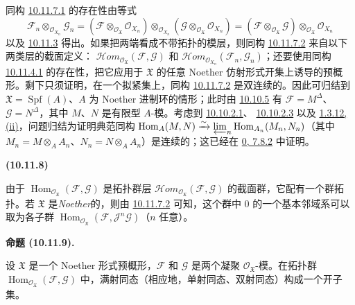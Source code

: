 \documentclass[UTF8,fontset=none,11pt,oneside,openany]{ctexbook}
\newenvironment{env}[1][]{%
  \par\medskip\noindent\textbf{(#1)}\ %
}{\par}
\newenvironment{proposition}[1][]{%
  \par\medskip\noindent\textbf{命题 (#1).}\ %
}{\par}
\let\EGAOriginalLabel\label
\renewcommand{\label}[1]{\phantomsection\EGAOriginalLabel{#1}}
\begin{document}
同构 \hyperref[I.10.11.7.1-fr]{10.11.7.1} 的存在性由等式
\[
  \mathscr{F}_n\otimes_{\mathscr{O}_{X_n}}\mathscr{G}_n
  =
  (\mathscr{F}\otimes_{\mathscr{O}_{\mathfrak{X}}}
  \mathscr{O}_{X_n})
  \otimes_{\mathscr{O}_{X_n}}
  (\mathscr{G}\otimes_{\mathscr{O}_{\mathfrak{X}}}
  \mathscr{O}_{X_n})
  =
  (\mathscr{F}\otimes_{\mathscr{O}_{\mathfrak{X}}}\mathscr{G})
  \otimes_{\mathscr{O}_{\mathfrak{X}}}\mathscr{O}_{X_n}
\]
以及 \hyperref[I.10.11.3-fr]{10.11.3} 得出。如果把两端看成不带拓扑的模层，则同构
\hyperref[I.10.11.7.2-fr]{10.11.7.2} 来自以下两类层的截面定义：
$\mathscr{H}\!om_{\mathscr{O}_{\mathfrak{X}}}
(\mathscr{F},\mathscr{G})$ 和
$\mathscr{H}\!om_{\mathscr{O}_{X_n}}(\mathscr{F}_n,\mathscr{G}_n)$；还要使用同构
\hyperref[I.10.11.4.1-fr]{10.11.4.1} 的存在性，把它应用于 $\mathfrak{X}$ 的任意 Noether 仿射形式开集上诱导的预概形。剩下只须证明，在一个拟紧集上，同构
\hyperref[I.10.11.7.2-fr]{10.11.7.2} 是双连续的。因此可归结到
$\mathfrak{X}=\operatorname{Spf}(A)$、$A$ 为 Noether 进制环的情形；此时由
\hyperref[I.10.10.5-fr]{10.10.5} 有
$\mathscr{F}=M^\Delta$、$\mathscr{G}=N^\Delta$，其中 $M$、$N$ 是有限型 $A$-模。考虑到
\hyperref[I.10.10.2.1-fr]{10.10.2.1}、
\hyperref[I.10.10.2.3-fr]{10.10.2.3} 以及
\hyperref[I.1.3.12-fr]{1.3.12, (ii)}，问题归结为证明典范同构
$\operatorname{Hom}_A(M,N)\xrightarrow{\sim}
\varprojlim_n\operatorname{Hom}_{A_n}(M_n,N_n)$（其中
$M_n=M\otimes_A A_n$、$N_n=N\otimes_A A_n$）是连续的；这已经在
\hyperref[0.7.8.2-fr]{0, 7.8.2} 中证明。

\begin{env}[10.11.8]
\label{I.10.11.8-fr}
由于 $\operatorname{Hom}_{\mathscr{O}_{\mathfrak{X}}}
(\mathscr{F},\mathscr{G})$ 是拓扑群层
$\mathscr{H}\!om_{\mathscr{O}_{\mathfrak{X}}}
(\mathscr{F},\mathscr{G})$ 的截面群，它配有一个群拓扑。若
$\mathfrak{X}$ 是\emph{Noether}的，则由
\hyperref[I.10.11.7.2-fr]{10.11.7.2} 可知，这个群中 $0$ 的一个基本邻域系可以取为各子群
$\operatorname{Hom}_{\mathscr{O}_{\mathfrak{X}}}
(\mathscr{F},\mathscr{J}^n\mathscr{G})$（$n$ 任意）。
\end{env}

\begin{proposition}[10.11.9]
\label{I.10.11.9-fr}
设 $\mathfrak{X}$ 是一个 Noether 形式预概形，$\mathscr{F}$ 和 $\mathscr{G}$ 是两个凝聚
$\mathscr{O}_{\mathfrak{X}}$-模。在拓扑群
$\operatorname{Hom}_{\mathscr{O}_{\mathfrak{X}}}
(\mathscr{F},\mathscr{G})$ 中，满射同态（相应地，单射同态、双射同态）构成一个开子集。
\end{proposition}
\end{document}
